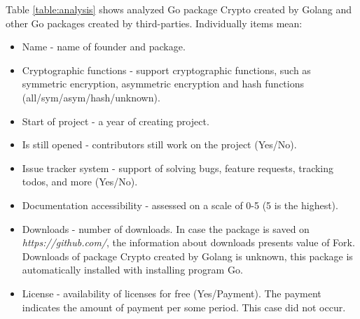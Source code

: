 \documentclass[
  digital, %
  notable,   %
  lof,     %
  lot,     %
]{fithesis3}
\begin{document}
Table \ref{table:analysis} shows analyzed Go package Crypto created by Golang and other Go 
packages created by third-parties. Individually items mean:
\vskip0.1in
\begin{itemize}[leftmargin=2em,rightmargin=1em,itemsep=0.75\parskip,parsep=0em,topsep=0em,partopsep=0em]
\item Name - name of founder and package.
\item Cryptographic functions - support cryptographic functions, such as symmetric encryption, asymmetric encryption and hash functions (all/sym/asym/hash/unknown).
\item Start of project - a year of creating project.
\item Is still opened - contributors still work on the project (Yes/No).
\item Issue tracker system - support of solving bugs, feature requests, tracking todos, and more (Yes/No).
\item Documentation accessibility - assessed on a scale of 0-5 (5 is the highest).
\item Downloads - number of downloads. In case the package is saved on \textit{https://github.com/}, the information about downloads presents value of Fork. Downloads of package Crypto created by Golang is unknown, this package is automatically installed with installing program Go.  
\item License - availability of licenses for free (Yes/Payment). The payment indicates the amount of payment per some period. This case did not occur.
\end{itemize}
\vskip0.1in
\end{document}
